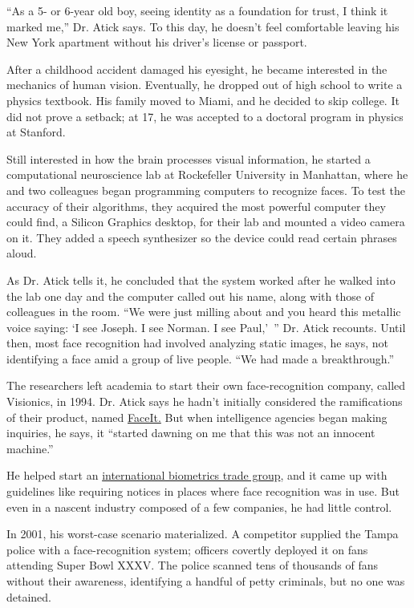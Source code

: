 ``As a 5- or 6-year old boy, seeing identity as a foundation for trust,
I think it marked me,'' Dr. Atick says. To this day, he doesn't feel
comfortable leaving his New York apartment without his driver's license
or passport.

After a childhood accident damaged his eyesight, he became interested in
the mechanics of human vision. Eventually, he dropped out of high school
to write a physics textbook. His family moved to Miami, and he decided
to skip college. It did not prove a setback; at 17, he was accepted to a
doctoral program in physics at Stanford.

Still interested in how the brain processes visual information, he
started a computational neuroscience lab at Rockefeller University in
Manhattan, where he and two colleagues began programming computers to
recognize faces. To test the accuracy of their algorithms, they acquired
the most powerful computer they could find, a Silicon Graphics desktop,
for their lab and mounted a video camera on it. They added a speech
synthesizer so the device could read certain phrases aloud.

As Dr. Atick tells it, he concluded that the system worked after he
walked into the lab one day and the computer called out his name, along
with those of colleagues in the room. ``We were just milling about and
you heard this metallic voice saying: `I see Joseph. I see Norman. I see
Paul,'~'' Dr. Atick recounts. Until then, most face recognition had
involved analyzing static images, he says, not identifying a face amid a
group of live people. ``We had made a breakthrough.''

The researchers left academia to start their own face-recognition
company, called Visionics, in 1994. Dr. Atick says he hadn't initially
considered the ramifications of their product, named
\href{http://www.prnewswire.com/news-releases/face-recognition-software-from-visionics-wins-pc-week-best-of-show-award-at-comdex-77726772.html}{FaceIt.}
But when intelligence agencies began making inquiries, he says, it
``started dawning on me that this was not an innocent machine.''

He helped start an \href{http://www.ibia.org/}{international biometrics
trade group}, and it came up with guidelines like requiring notices in
places where face recognition was in use. But even in a nascent industry
composed of a few companies, he had little control.

In 2001, his worst-case scenario materialized. A competitor supplied the
Tampa police with a face-recognition system; officers covertly deployed
it on fans attending Super Bowl XXXV. The police scanned tens of
thousands of fans without their awareness, identifying a handful of
petty criminals, but no one was detained.

